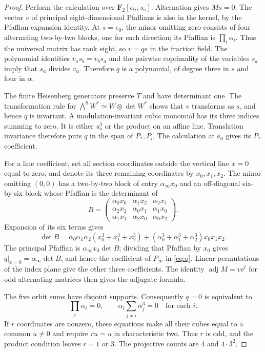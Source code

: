 \documentclass[11pt]{article}
\theoremstyle{definition}\newtheorem{definition}[theorem]{Definition}
\theoremstyle{remark}\newtheorem{remark}[theorem]{Remark}
\newcommand{\FF}{\mathbf F}
\begin{document}
\begin{proof}
Perform the calculation over $\FF_2[\alpha_i,s_a]$. Alternation gives $Ms=0$. The vector $v$ of principal eight-dimensional Pfaffians is also in the kernel, by the Pfaffian expansion identity. At $s=e_0$, the minor omitting zero consists of four alternating two-by-two blocks, one for each direction; its Pfaffian is $\prod_i\alpha_i$. Thus the universal matrix has rank eight, so $v=qs$ in the fraction field. The polynomial identities $v_as_b=v_bs_a$ and the pairwise coprimality of the variables $s_a$ imply that $s_a$ divides $v_a$. Therefore $q$ is a polynomial, of degree three in $s$ and four in $\alpha$.

The finite Heisenberg generators preserve $T$ and have determinant one. The transformation rule for $\bigwedge^8W^*\simeq W\otimes\det W^*$ shows that $v$ transforms as $s$, and hence $q$ is invariant. A modulation-invariant cubic monomial has its three indices summing to zero. It is either $s_a^3$ or the product on an affine line. Translation invariance therefore puts $q$ in the span of $P_*,P_i$. The calculation at $e_0$ gives its $P_*$ coefficient.

For a line coefficient, set all section coordinates outside the vertical line $x=0$ equal to zero, and denote its three remaining coordinates by $x_0,x_1,x_2$. The minor omitting $(0,0)$ has a two-by-two block of entry $\alpha_\infty x_0$ and an off-diagonal six-by-six block whose Pfaffian is the determinant of
\[
 B=\begin{pmatrix}
 \alpha_0x_0&\alpha_1x_2&\alpha_2x_1\\
 \alpha_2x_2&\alpha_0x_1&\alpha_1x_0\\
 \alpha_1x_1&\alpha_2x_0&\alpha_0x_2
 \end{pmatrix}.
\]
Expansion of its six terms gives
\[
 \det B=\alpha_0\alpha_1\alpha_2(x_0^3+x_1^3+x_2^3)
 +(\alpha_0^3+\alpha_1^3+\alpha_2^3)x_0x_1x_2.
\]
The principal Pfaffian is $\alpha_\infty x_0\det B$; dividing that Pfaffian by $x_0$ gives $q|_{x=0}=\alpha_\infty\det B$, and hence the coefficient of $P_\infty$ in \eqref{eq:q}. Linear permutations of the index plane give the other three coefficients. The identity $\operatorname{adj}M=vv^t$ for odd alternating matrices then gives the adjugate formula.

The five orbit sums have disjoint supports. Consequently $q=0$ is equivalent to
\[
 \prod_i\alpha_i=0,\qquad
 \alpha_i\sum_{j\ne i}\alpha_j^3=0\quad\text{for each }i.
\]
If $r$ coordinates are nonzero, these equations make all their cubes equal to a common $u\ne0$ and require $ru=u$ in characteristic two. Thus $r$ is odd, and the product condition leaves $r=1$ or $3$. The projective counts are $4$ and $4\cdot3^2$.


\end{proof}
\end{document}
